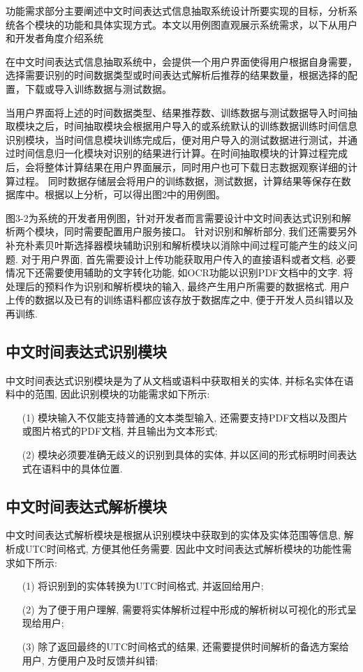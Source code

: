功能需求部分主要阐述中文时间表达式信息抽取系统设计所要实现的目标，分析系统各个模块的功能和具体实现方式。本文以用例图直观展示系统需求，以下从用户和开发者角度介绍系统

在中文时间表达式信息抽取系统中，会提供一个用户界面使得用户根据自身需要，选择需要识别的时间数据类型或时间表达式解析后推荐的结果数量，根据选择的配置，下载或导入训练数据与测试数据。

当用户界面将上述的时间数据类型、结果推荐数、训练数据与测试数据导入时间抽取模块之后，时间抽取模块会根据用户导入的或系统默认的训练数据训练时间信息识别模块，当时间信息模块训练完成后，便对用户导入的测试数据进行测试，并通过时间信息归一化模块对识别的结果进行计算。在时间抽取模块的计算过程完成后，会将整体计算结果在用户界面展示，同时用户也可下载日志数据观察详细的计算过程。
同时数据存储层会将用户的训练数据，测试数据，计算结果等保存在数据库中。根据以上分析，可以得出图2中的用例图。

图3-2为系统的开发者用例图，针对开发者而言需要设计中文时间表达式识别和解析两个模块，同时需要配置用户服务接口。
针对识别和解析部分, 我们还需要另外补充朴素贝叶斯选择器模块辅助识别和解析模块以消除中间过程可能产生的歧义问题.
对于用户界面, 首先需要设计上传功能获取用户传入的直接语料或者文档, 必要情况下还需要使用辅助的文字转化功能, 如OCR功能以识别PDF文档中的文字.
将处理后的预料作为识别和解析模块的输入, 最终产生用户所需要的数据格式.
用户上传的数据以及已有的训练语料都应该存放于数据库之中, 便于开发人员纠错以及再训练.

\subsection{中文时间表达式识别模块}

中文时间表达式识别模块是为了从文档或语料中获取相关的实体, 并标名实体在语料中的范围, 因此识别模块的功能需求如下所示:
\begin{enumerate}
    \item[(1)] 模块输入不仅能支持普通的文本类型输入, 还需要支持PDF文档以及图片或图片格式的PDF文档, 并且输出为文本形式;
    \item[(2)] 模块必须要准确无歧义的识别到具体的实体, 并以区间的形式标明时间表达式在语料中的具体位置.
\end{enumerate}

\subsection{中文时间表达式解析模块}

中文时间表达式解析模块是根据从识别模块中获取到的实体及实体范围等信息, 解析成UTC时间格式, 方便其他任务需要.
因此中文时间表达式解析模块的功能性需求如下所示:
\begin{enumerate}
    \item[(1)] 将识别到的实体转换为UTC时间格式, 并返回给用户;
    \item[(2)] 为了便于用户理解, 需要将实体解析过程中形成的解析树以可视化的形式呈现给用户;
    \item[(3)] 除了返回最终的UTC时间格式的结果, 还需要提供时间解析的备选方案给用户, 方便用户及时反馈并纠错;
\end{enumerate}

